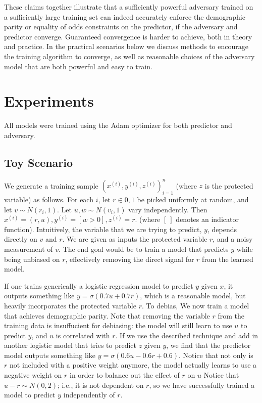\documentclass[letterpaper]{article} %
\theoremstyle{definition}
\begin{document}
These claims together illustrate that a sufficiently powerful adversary trained on a sufficiently large training set can indeed accurately enforce the demographic parity or equality of odds constraints on the predictor, if the adversary and predictor converge. Guaranteed convergence is harder to achieve, both in theory and practice. In the practical scenarios below we discuss methods to encourage the training algorithm to converge, as well as reasonable choices of the adversary model that are both powerful and easy to train.


\section{Experiments} \label{section:experiments}

All models were trained using the Adam optimizer \cite{kingma2014adam} for both predictor and adversary.

\subsection{Toy Scenario}

We generate a training sample ${(x^{(i)},y^{(i)},z^{(i)})}_{i=1}^{n}$ (where $z$ is the protected variable) as follows. For each $i$, let $r \in {0,1}$ be picked uniformly at random, and let $v \sim N(r_{i},1)$. Let $u,w \sim N(v_{i},1)$ vary independently. Then $x^{(i)}=(r,u),y^{(i)}=[w>0],z^{(i)}=r$. (where $[~]$ denotes an indicator function). Intuitively, the variable that we are trying to predict, $y$, depends directly on $v$ and $r$. We are given as inputs the protected variable $r$, and a noisy measurement of $v$.  The end goal would be to train a model that predicts $y$ while being unbiased on $r$, effectively removing the direct signal for $r$ from the learned model. 

If one trains generically a logistic regression model to predict $y$ given $x$, it outputs something like $y=\sigma(0.7u+0.7r)$, which is a reasonable model, but heavily incorporates the protected variable $r$. To debias, We now train a model that achieves {\sc demographic parity}. Note that removing the variable $r$ from the training data is insuffucient for debiasing: the model will still learn to use $u$ to predict $y$, and $u$ is correlated with $r$. If we use the described technique and add in another logistic model that tries to predict $z$ given $y$, we find that the predictor model outputs something like $y=\sigma(0.6u-0.6r+0.6)$. Notice that not only is $r$ not included with a positive weight anymore, the model actually learns to use a negative weight on $r$ in order to balance out the effect of $r$ on $u$  Notice that $u-r \sim N(0,2)$; i.e., it is not dependent on $r$, so we have successfully trained a model to predict $y$ independently of $r$.
\end{document}
